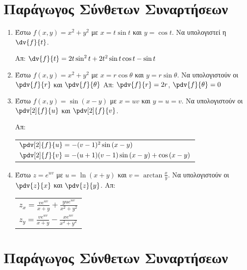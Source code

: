 







\begin{center}
\end{center} 


\section*{Παράγωγος Σύνθετων Συναρτήσεων}

\begin{enumerate}
    \item Έστω $ f(x,y) = x^{2}+y^{2} $ με $ x = t \sin{t} $ και $ y = \cos{t} $. 
        Να υπολογιστεί η $ \dv{f}{t} $. 

        \hfill Απ: $ \dv{f}{t} = 2t \sin^{2}{t} + 2t^{2} \sin{t} \cos{t} - \sin{t} $ 

    \item  Έστω $ f(x,y) = x^{2}+y^{2} $ με $ x = r \cos{\theta} $ και 
        $ y = r \sin{\theta} $. Να υπολογιστούν οι $ \pdv{f}{r} $ και 
        $ \pdv{f}{\theta} $
        \hfill Απ: $ \pdv{f}{r} = 2r $, $ \pdv{f}{\theta} = 0 $  
    \item Έστω $ f(x,y) = \sin{(x-y)} $ με $ x = uv $ και $ y = u=v $. Να 
        υπολογιστούν οι $ \pdv[2]{f}{u} $ και $ \pdv[2]{f}{v} $.

        \hfill Απ: \begin{tabular}{l}
            $ \pdv[2]{f}{u} = -(v-1)^{2} \sin{(x-y)} $ \\
            $ \pdv[2]{f}{v} = -(u+1)(v-1) \sin{(x-y)} + \cos{(x-y)} $
        \end{tabular}

    \item Έστω $ z = e^{uv} $ με $ u = \ln{(x+y)} $ και $ v = \arctan{\frac{x}{y}
        } $. Να υπολογιστούν οι $ \pdv{z}{x} $ και $ \pdv{z}{y} $. 
        \hfill Απ: \begin{tabular}{l}
            $ z_{x} = \frac{ve^{uv}}{x+y} + \frac{yue^{uv}}{x^{2}+y^{2}} $ \\
            $ z_{y} = \frac{ve^{uv}}{x+y} - \frac{xe^{uv}}{x^{2}+y^{2}} $
        \end{tabular}

\end{enumerate}

\section*{Παράγωγος Σύνθετων Συναρτήσεων} 

